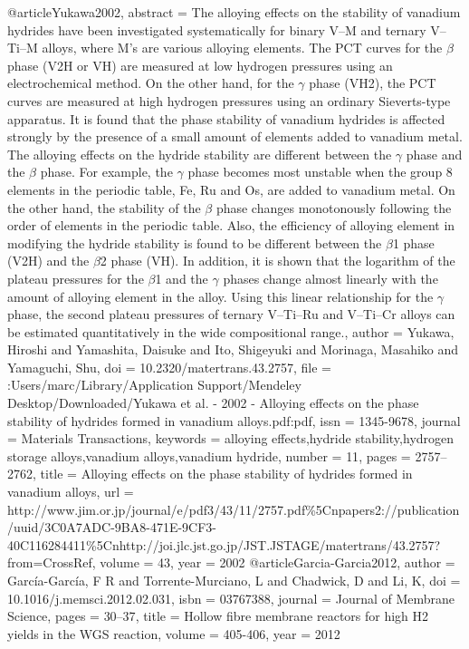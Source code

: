 @article{Yukawa2002,
abstract = {The alloying effects on the stability of vanadium hydrides have been investigated systematically for binary V–M and ternary V–Ti–M alloys, where M's are various alloying elements. The PCT curves for the $\beta$ phase (V2H or VH) are measured at low hydrogen pressures using an electrochemical method. On the other hand, for the $\gamma$ phase (VH2), the PCT curves are measured at high hydrogen pressures using an ordinary Sieverts-type apparatus. It is found that the phase stability of vanadium hydrides is affected strongly by the presence of a small amount of elements added to vanadium metal. The alloying effects on the hydride stability are different between the $\gamma$ phase and the $\beta$ phase. For example, the $\gamma$ phase becomes most unstable when the group 8 elements in the periodic table, Fe, Ru and Os, are added to vanadium metal. On the other hand, the stability of the $\beta$ phase changes monotonously following the order of elements in the periodic table. Also, the efficiency of alloying element in modifying the hydride stability is found to be different between the $\beta$1 phase (V2H) and the $\beta$2 phase (VH). In addition, it is shown that the logarithm of the plateau pressures for the $\beta$1 and the $\gamma$ phases change almost linearly with the amount of alloying element in the alloy. Using this linear relationship for the $\gamma$ phase, the second plateau pressures of ternary V–Ti–Ru and V–Ti–Cr alloys can be estimated quantitatively in the wide compositional range.},
author = {Yukawa, Hiroshi and Yamashita, Daisuke and Ito, Shigeyuki and Morinaga, Masahiko and Yamaguchi, Shu},
doi = {10.2320/matertrans.43.2757},
file = {:Users/marc/Library/Application Support/Mendeley Desktop/Downloaded/Yukawa et al. - 2002 - Alloying effects on the phase stability of hydrides formed in vanadium alloys.pdf:pdf},
issn = {1345-9678},
journal = {Materials Transactions},
keywords = {alloying effects,hydride stability,hydrogen storage alloys,vanadium alloys,vanadium hydride},
number = {11},
pages = {2757--2762},
title = {{Alloying effects on the phase stability of hydrides formed in vanadium alloys}},
url = {http://www.jim.or.jp/journal/e/pdf3/43/11/2757.pdf{\%}5Cnpapers2://publication/uuid/3C0A7ADC-9BA8-471E-9CF3-40C116284411{\%}5Cnhttp://joi.jlc.jst.go.jp/JST.JSTAGE/matertrans/43.2757?from=CrossRef},
volume = {43},
year = {2002}
}
@article{Garcia-Garcia2012,
author = {Garc{\'{i}}a-Garc{\'{i}}a, F R and Torrente-Murciano, L and Chadwick, D and Li, K},
doi = {10.1016/j.memsci.2012.02.031},
isbn = {03767388},
journal = {Journal of Membrane Science},
pages = {30--37},
title = {{Hollow fibre membrane reactors for high H2 yields in the WGS reaction}},
volume = {405-406},
year = {2012}
}
